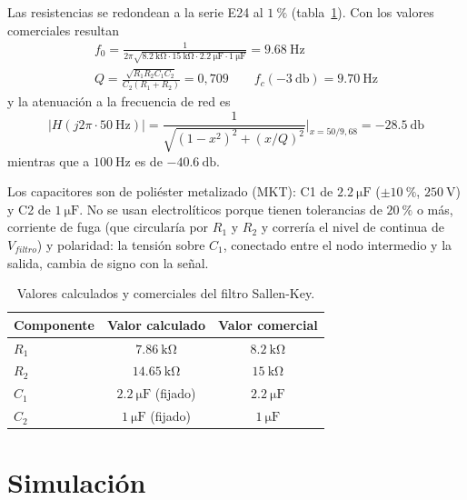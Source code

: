 Las resistencias se redondean a la serie E24 al $\SI{1}{\percent}$ (tabla~\ref{tab:campo-componentes}). Con los
valores comerciales resultan
\begin{gather*}
  f_0 = \frac{1}{2 \pi \sqrt{\SI{8.2}{\kilo\ohm} \cdot \SI{15}{\kilo\ohm} \cdot \SI{2.2}{\micro\farad} \cdot
    \SI{1}{\micro\farad}}} = \SI{9.68}{\hertz} \\
  Q = \frac{\sqrt{R_1 R_2 C_1 C_2}}{C_2 (R_1 + R_2)} = 0{,}709 \qquad f_c(\SI{-3}{\decibel}) = \SI{9.70}{\hertz}
\end{gather*}
y la atenuación a la frecuencia de red es
\begin{equation}
  |H(j 2 \pi \cdot \SI{50}{\hertz})| = \frac{1}{\sqrt{\left(1 - x^2\right)^2 + \left(x / Q\right)^2}}
  \bigg|_{x = 50 / 9{,}68} = \SI{-28.5}{\decibel}
  \label{eq:campo-h50}
\end{equation}
mientras que a $\SI{100}{\hertz}$ es de $\SI{-40.6}{\decibel}$.

Los capacitores son de poliéster metalizado (MKT): C1 de $\SI{2.2}{\micro\farad}$ ($\pm\SI{10}{\percent}$,
$\SI{250}{\volt}$) y C2 de $\SI{1}{\micro\farad}$. No se usan electrolíticos porque tienen tolerancias de
$\SI{20}{\percent}$ o más, corriente de fuga (que circularía por $R_1$ y $R_2$ y correría el nivel de continua de
$V_{filtro}$) y polaridad: la tensión sobre $C_1$, conectado entre el nodo intermedio y la salida, cambia de signo
con la señal.

\begin{table}[!ht]
  \centering
  \begin{tabular}{|l|c|c|}
    \hline
    Componente & Valor calculado & Valor comercial \\
    \hline
    $R_1$ & $\SI{7.86}{\kilo\ohm}$ & $\SI{8.2}{\kilo\ohm}$ \\
    $R_2$ & $\SI{14.65}{\kilo\ohm}$ & $\SI{15}{\kilo\ohm}$ \\
    $C_1$ & $\SI{2.2}{\micro\farad}$ (fijado) & $\SI{2.2}{\micro\farad}$ \\
    $C_2$ & $\SI{1}{\micro\farad}$ (fijado) & $\SI{1}{\micro\farad}$ \\
    \hline
  \end{tabular}
  \caption{Valores calculados y comerciales del filtro Sallen-Key.}
  \label{tab:campo-componentes}
\end{table}

\section{Simulación}
\label{sec:campo-simulacion}

